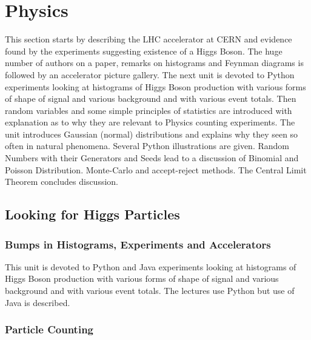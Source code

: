 

\chapter{Physics}
\label{c:physics}


\FILENAME

This section starts by describing the LHC accelerator at CERN and
evidence found by the experiments suggesting existence of a Higgs Boson.
The huge number of authors on a paper, remarks on histograms and Feynman
diagrams is followed by an accelerator picture gallery. The next unit is
devoted to Python experiments looking at histograms of Higgs Boson
production with various forms of shape of signal and various background
and with various event totals. Then random variables and some simple
principles of statistics are introduced with explanation as to why they
are relevant to Physics counting experiments. The unit introduces
Gaussian (normal) distributions and explains why they seen so often in
natural phenomena. Several Python illustrations are given. Random
Numbers with their Generators and Seeds lead to a discussion of Binomial
and Poisson Distribution. Monte-Carlo and accept-reject methods. The
Central Limit Theorem concludes discussion.

\section{Looking for Higgs Particles}

\subsection{Bumps in Histograms,  Experiments and Accelerators}

This unit is devoted to Python and Java experiments looking at
histograms of Higgs Boson production with various forms of shape of
signal and various background and with various event totals. The
lectures use Python but use of Java is described.




\subsection{Particle Counting}

